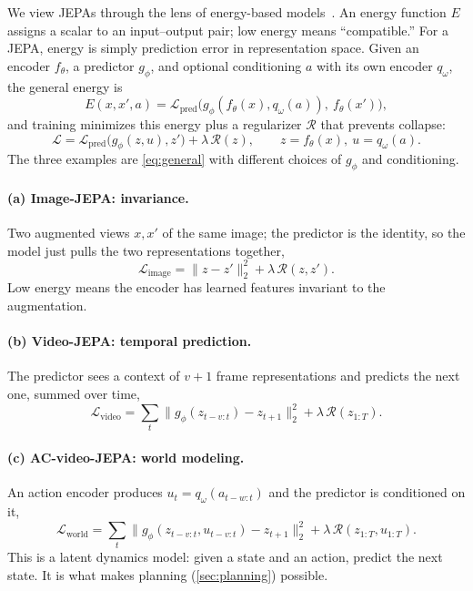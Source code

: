 \documentclass{article}
\begin{document}
We view JEPAs through the lens of energy-based models~\citep{LeCunEBMTutorial2006}.
An energy function $E$ assigns a scalar to an input--output pair; low energy means
``compatible.'' For a JEPA, energy is simply prediction error in representation
space. Given an encoder $f_\theta$, a predictor $g_\phi$, and optional
conditioning $a$ with its own encoder $q_\omega$, the general energy is
\begin{equation}
E(x, x', a) = \mathcal{L}_{\text{pred}}\big(g_\phi(f_\theta(x), q_\omega(a)),\ f_\theta(x')\big),
\label{eq:energy}
\end{equation}
and training minimizes this energy plus a regularizer $\mathcal{R}$ that prevents
collapse:
\begin{equation}
\mathcal{L} = \mathcal{L}_{\text{pred}}\big(g_\phi(z, u), z'\big) + \lambda\,\mathcal{R}(z),
\qquad z = f_\theta(x),\ u = q_\omega(a).
\label{eq:general}
\end{equation}
The three examples are \cref{eq:general} with different choices of $g_\phi$ and
conditioning.

\paragraph{(a) Image-JEPA: invariance.} Two augmented views $x, x'$ of the same
image; the predictor is the identity, so the model just pulls the two
representations together,
\begin{equation}
\mathcal{L}_{\text{image}} = \|z - z'\|_2^2 + \lambda\,\mathcal{R}(z, z').
\label{eq:image}
\end{equation}
Low energy means the encoder has learned features invariant to the augmentation.

\paragraph{(b) Video-JEPA: temporal prediction.} The predictor sees a context of
$v{+}1$ frame representations and predicts the next one, summed over time,
\begin{equation}
\mathcal{L}_{\text{video}} = \sum_{t} \|g_\phi(z_{t-v:t}) - z_{t+1}\|_2^2 + \lambda\,\mathcal{R}(z_{1:T}).
\label{eq:video}
\end{equation}

\paragraph{(c) AC-video-JEPA: world modeling.} An action encoder produces
$u_t = q_\omega(a_{t-w:t})$ and the predictor is conditioned on it,
\begin{equation}
\mathcal{L}_{\text{world}} = \sum_{t} \|g_\phi(z_{t-v:t}, u_{t-v:t}) - z_{t+1}\|_2^2 + \lambda\,\mathcal{R}(z_{1:T}, u_{1:T}).
\label{eq:world}
\end{equation}
This is a latent dynamics model: given a state and an action, predict the next
state. It is what makes planning (\cref{sec:planning}) possible.
\end{document}
